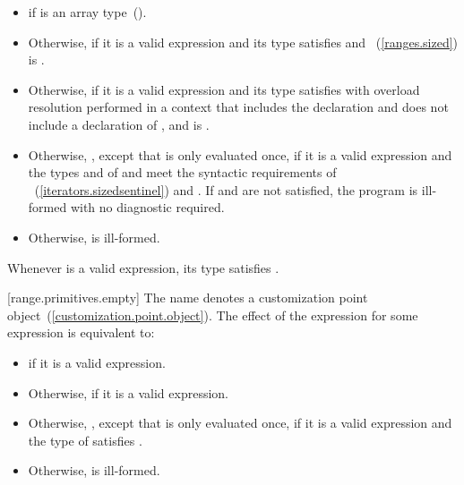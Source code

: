 \begin{itemize}
\item
   if  is an array
  type~().

\item
  Otherwise,  if it is a valid expression and its type 
  satisfies  and
  ~(\ref{ranges.sized}) is
  .

\item
  Otherwise,  if it is a valid expression and its type 
  satisfies  with overload resolution
  performed in a context that includes the declaration
   and does not include
  a declaration of , and
   is .

\item
  Otherwise,
  , except that 
  is only evaluated once, if it is a valid expression and the types  and  of
   and  meet the
  syntactic requirements of
  ~(\ref{iterators.sizedsentinel}) and
  . If  and
   are not satisfied, the program is ill-formed with no
  diagnostic required.

\item
  Otherwise,  is ill-formed.
\end{itemize}

\pnum
\enternote Whenever  is a valid expression, its
type satisfies . \exitnote

[range.primitives.empty]{}
\pnum
The name  denotes a customization point
object~(\ref{customization.point.object}). The effect of the expression
 for some expression  is
equivalent to:

\begin{itemize}
\item
   if it is a valid expression.

\item
  Otherwise,  if it is a valid expression.

\item
  Otherwise, ,
  except that  is only evaluated once, if it is a valid expression and the type of
   satisfies .

\item
  Otherwise,  is ill-formed.
\end{itemize}

